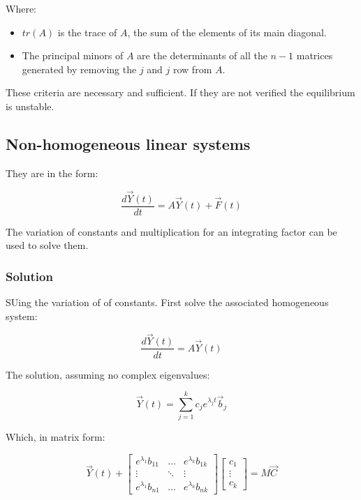       Where:

      \begin{multicols}{2}
        \begin{itemize}
          \item $tr(A)$ is the trace of $A$, the sum of the elements of its main diagonal.
          \item The principal minors of $A$ are the determinants of all the $n-1$ matrices generated by removing the $j$ and $j$ row from $A$.
        \end{itemize}
      \end{multicols}

      These criteria are necessary and sufficient.
      If they are not verified the equilibrium is unstable.

  \subsection{Non-homogeneous linear systems}
  They are in the form:

  $$\frac{d\vec{Y}(t)}{dt} = A\vec{Y}(t) + \vec{F}(t)$$

  The variation of constants and multiplication for an integrating factor can be used to solve them.

    \subsubsection{Solution}
    SUing the variation of of constants.
    First solve the associated homogeneous system:

    $$\frac{d\vec{Y}(t)}{dt} = A\vec{Y}(t)$$

    The solution, assuming no complex eigenvalues:

    $$\vec{Y}(t) = \sum\limits_{j=1}^kc_je^{\lambda_jt}\vec{b}_j$$

    Which, in matrix form:

    $$\vec{Y}(t) + \begin{bmatrix} e^{\lambda_1}b_{11} & \dots & e^{\lambda_k}b_{1k} \\ \vdots & \ddots & \vdots \\ e^{\lambda_1}b_{n1} & \dots & e^{\lambda_k}b_{nk} \end{bmatrix}\begin{bmatrix} c_1\\\vdots\\ c_k\end{bmatrix} = M\vec{C}$$


